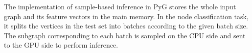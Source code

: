 The implementation of sample-based inference in PyG stores the whole input graph and its feature vectors in the main memory.
%
In the node classification task, it splits the vertices in the test set into batches according to the given batch size.
%
The subgraph corresponding to each batch is sampled on the CPU side and sent to the GPU side to perform inference.
%